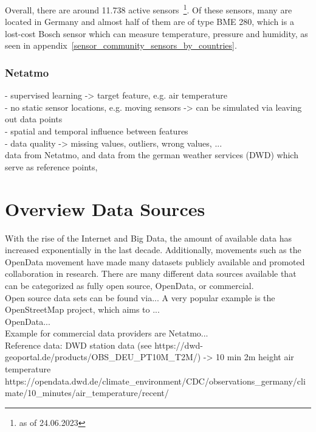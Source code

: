 Overall, there are around 11.738 active sensors~\footnote{as of 24.06.2023}. Of these sensors, many are located in Germany and almost half of them are of type BME 280, which is a lost-cost Bosch sensor which can measure temperature, pressure and humidity, as seen in appendix~\ref{sensor_community_sensors_by_countries}.

\subsubsection{Netatmo}



- supervised learning -> target feature, e.g. air temperature\\
- no static sensor locations, e.g. moving sensors -> can be simulated via leaving out data points\\
- spatial and temporal influence between features\\
- data quality -> missing values, outliers, wrong values, ...\\

data from Netatmo, and data from the german weather services (DWD) which serve as reference points,

\section{Overview Data Sources}

With the rise of the Internet and Big Data, the amount of available data has increased exponentially in the last decade. Additionally, movements such as the OpenData movement have made many datasets publicly available and promoted collaboration in research. There are many different data sources available that can be categorized as fully open source, OpenData, or commercial.\\
Open source data sets can be found via... A very popular example is the OpenStreetMap project, which aims to ...\\
OpenData...\\
Example for commercial data providers are Netatmo...\\

Reference data: DWD station data (see https://dwd-geoportal.de/products/OBS\_DEU\_PT10M\_T2M/) -> 10 min 2m height air temperature
https://opendata.dwd.de/climate\_environment/CDC/observations\_germany/climate/10\_minutes/air\_temperature/recent/

